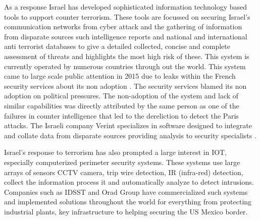 As a response Israel has developed sophisticated information technology based tools to support counter terrorism. These tools are focussed on securing Israel's communication networks from cyber attack and the gathering of information  from disparate sources such intelligence reports and national and international anti terrorist databases to give a detailed collected, concise and complete assessment of threats and highlights the most high risk of these. This system is currently operated by numerous countries through out the world. This system came to large scale public attention in 2015 due to leaks within the French security services about its non adoption \citep{Israelcounterterrorismlessonfrance}. 
The security services blamed its non adoption on political pressures. The non-adoption of the system and lack of similar capabilities was directly attributed by the same person as one of the failures in counter intelligence that led to the dereliction to detect the Paris attacks. The Israeli company Verint specializes in software designed to integrate and collate data from disparate sources  providing analysis to security specialists \citep{zureik2010surveillance}.

Israel's response to terrorism has also prompted a large interest in IOT, especially  computerized perimeter security systems. These systems use  large arrays of sensors CCTV camera, trip wire detection, IR (infra-red) detection, collect the information process it and automatically analyze to detect intrusions. Companies such as IDSST and Orad Group \citep{gordon2011israel} have commercialized such systems and implemented solutions throughout the world for everything from  protecting industrial plants, key infrastructure to helping securing the US Mexico border.

